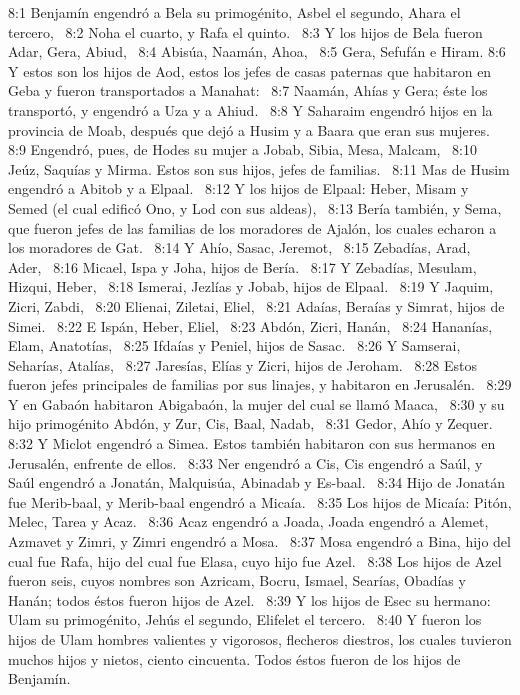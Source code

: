 8:1 Benjamín engendró a Bela su primogénito, Asbel el segundo, Ahara el tercero,  
8:2 Noha el cuarto, y Rafa el quinto.  
8:3 Y los hijos de Bela fueron Adar, Gera, Abiud,  
8:4 Abisúa, Naamán, Ahoa,  
8:5 Gera, Sefufán e Hiram. 
8:6 Y estos son los hijos de Aod, estos los jefes de casas paternas que habitaron en Geba y fueron transportados a Manahat:  
8:7 Naamán, Ahías y Gera; éste los transportó, y engendró a Uza y a Ahiud.  
8:8 Y Saharaim engendró hijos en la provincia de Moab, después que dejó a Husim y a Baara que eran sus mujeres.  
8:9 Engendró, pues, de Hodes su mujer a Jobab, Sibia, Mesa, Malcam,  
8:10 Jeúz, Saquías y Mirma. Estos son sus hijos, jefes de familias.  
8:11 Mas de Husim engendró a Abitob y a Elpaal.  
8:12 Y los hijos de Elpaal: Heber, Misam y Semed (el cual edificó Ono, y Lod con sus aldeas),  
8:13 Bería también, y Sema, que fueron jefes de las familias de los moradores de Ajalón, los cuales echaron a los moradores de Gat.  
8:14 Y Ahío, Sasac, Jeremot,  
8:15 Zebadías, Arad, Ader,  
8:16 Micael, Ispa y Joha, hijos de Bería.  
8:17 Y Zebadías, Mesulam, Hizqui, Heber,  
8:18 Ismerai, Jezlías y Jobab, hijos de Elpaal.  
8:19 Y Jaquim, Zicri, Zabdi,  
8:20 Elienai, Ziletai, Eliel,  
8:21 Adaías, Beraías y Simrat, hijos de Simei.  
8:22 E Ispán, Heber, Eliel,  
8:23 Abdón, Zicri, Hanán,  
8:24 Hananías, Elam, Anatotías,  
8:25 Ifdaías y Peniel, hijos de Sasac.  
8:26 Y Samserai, Seharías, Atalías,  
8:27 Jaresías, Elías y Zicri, hijos de Jeroham.  
8:28 Estos fueron jefes principales de familias por sus linajes, y habitaron en Jerusalén.  
8:29 Y en Gabaón habitaron Abigabaón, la mujer del cual se llamó Maaca,  
8:30 y su hijo primogénito Abdón, y Zur, Cis, Baal, Nadab,  
8:31 Gedor, Ahío y Zequer.  
8:32 Y Miclot engendró a Simea. Estos también habitaron con sus hermanos en Jerusalén, enfrente de ellos.  
8:33 Ner engendró a Cis, Cis engendró a Saúl, y Saúl engendró a Jonatán, Malquisúa, Abinadab y Es-baal.  
8:34 Hijo de Jonatán fue Merib-baal, y Merib-baal engendró a Micaía.  
8:35 Los hijos de Micaía: Pitón, Melec, Tarea y Acaz.  
8:36 Acaz engendró a Joada, Joada engendró a Alemet, Azmavet y Zimri, y Zimri engendró a Mosa.  
8:37 Mosa engendró a Bina, hijo del cual fue Rafa, hijo del cual fue Elasa, cuyo hijo fue Azel.  
8:38 Los hijos de Azel fueron seis, cuyos nombres son Azricam, Bocru, Ismael, Searías, Obadías y Hanán; todos éstos fueron hijos de Azel.  
8:39 Y los hijos de Esec su hermano: Ulam su primogénito, Jehús el segundo, Elifelet el tercero.  
8:40 Y fueron los hijos de Ulam hombres valientes y vigorosos, flecheros diestros, los cuales tuvieron muchos hijos y nietos, ciento cincuenta. Todos éstos fueron de los hijos de Benjamín.  
